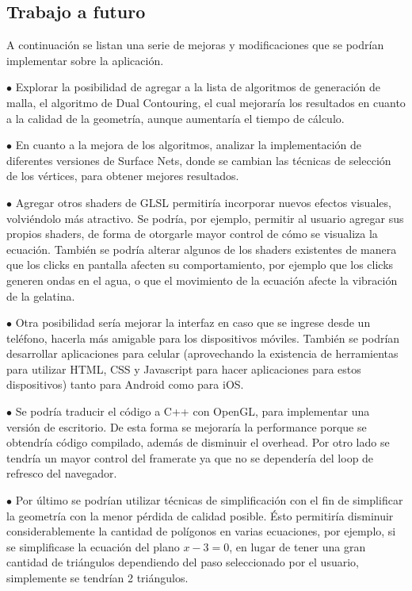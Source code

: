 \documentclass[12pt]{article}
\begin{document}
\subsection{Trabajo a futuro}
\noindent A continuación se listan una serie de mejoras y modificaciones que se podrían implementar sobre la aplicación.

$\bullet$ Explorar la posibilidad de agregar a la lista de algoritmos de generación de malla, el algoritmo de Dual Contouring\cite{dualcontour}, el cual mejoraría los resultados en cuanto a la calidad de la geometría, aunque aumentaría el tiempo de cálculo. 

$\bullet$ En cuanto a la mejora de los algoritmos, analizar la implementación de diferentes versiones de Surface Nets, donde se cambian las técnicas de selección de los vértices, para obtener mejores resultados.

$\bullet$ Agregar otros shaders de GLSL permitiría incorporar nuevos efectos visuales, volviéndolo más atractivo. Se podría, por ejemplo, permitir al usuario agregar sus propios shaders, de forma de otorgarle  mayor control de cómo se visualiza la ecuación. También se podría alterar algunos de los shaders existentes de manera que los clicks en pantalla afecten su comportamiento, por ejemplo que los clicks generen ondas en el agua, o que el movimiento de la ecuación afecte la vibración de la gelatina.

$\bullet$ Otra posibilidad sería mejorar la interfaz en caso que se ingrese desde un teléfono, hacerla más amigable para los dispositivos móviles. También se podrían desarrollar aplicaciones para celular (aprovechando la existencia de herramientas para utilizar HTML, CSS y Javascript para hacer aplicaciones para estos dispositivos) tanto para Android como para iOS. 

$\bullet$ Se podría traducir el código a C++ con OpenGL, para implementar una versión de escritorio. De esta forma se mejoraría la performance porque se obtendría código compilado, además de disminuir el overhead. Por otro lado se tendría un mayor control del framerate ya que no se dependería del loop de refresco del navegador.

$\bullet$ Por último se podrían utilizar técnicas de simplificación\cite{simplificacion}\cite{realtimerendering} con el fin de simplificar la geometría con la menor pérdida de calidad posible. Ésto permitiría disminuir considerablemente la cantidad de polígonos en varias ecuaciones, por ejemplo, si se simplificase la ecuación del plano $x-3=0$, en lugar de tener una gran cantidad de triángulos dependiendo del paso seleccionado por el usuario, simplemente se tendrían 2 triángulos.
\end{document}
